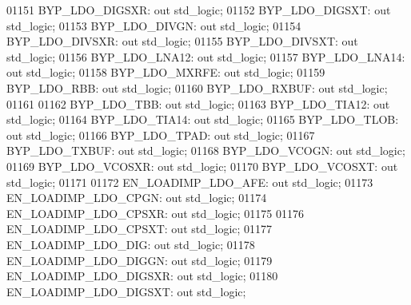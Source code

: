 \begin{DoxyCode}
01151         BYP\_LDO\_DIGSXR: \textcolor{keywordflow}{out} \textcolor{comment}{std\_logic};
01152         BYP\_LDO\_DIGSXT: \textcolor{keywordflow}{out} \textcolor{comment}{std\_logic};
01153         BYP\_LDO\_DIVGN:  \textcolor{keywordflow}{out} \textcolor{comment}{std\_logic};
01154         BYP\_LDO\_DIVSXR: \textcolor{keywordflow}{out} \textcolor{comment}{std\_logic};
01155         BYP\_LDO\_DIVSXT: \textcolor{keywordflow}{out} \textcolor{comment}{std\_logic};
01156         BYP\_LDO\_LNA12:  \textcolor{keywordflow}{out} \textcolor{comment}{std\_logic};
01157         BYP\_LDO\_LNA14:  \textcolor{keywordflow}{out} \textcolor{comment}{std\_logic};
01158         BYP\_LDO\_MXRFE:  \textcolor{keywordflow}{out} \textcolor{comment}{std\_logic};
01159         BYP\_LDO\_RBB:    \textcolor{keywordflow}{out} \textcolor{comment}{std\_logic};
01160         BYP\_LDO\_RXBUF:  \textcolor{keywordflow}{out} \textcolor{comment}{std\_logic};
01161 
01162         BYP\_LDO\_TBB:    \textcolor{keywordflow}{out} \textcolor{comment}{std\_logic};
01163         BYP\_LDO\_TIA12:  \textcolor{keywordflow}{out} \textcolor{comment}{std\_logic};
01164         BYP\_LDO\_TIA14:  \textcolor{keywordflow}{out} \textcolor{comment}{std\_logic};
01165         BYP\_LDO\_TLOB:   \textcolor{keywordflow}{out} \textcolor{comment}{std\_logic};
01166         BYP\_LDO\_TPAD:   \textcolor{keywordflow}{out} \textcolor{comment}{std\_logic};
01167         BYP\_LDO\_TXBUF:  \textcolor{keywordflow}{out} \textcolor{comment}{std\_logic};
01168         BYP\_LDO\_VCOGN:  \textcolor{keywordflow}{out} \textcolor{comment}{std\_logic};
01169         BYP\_LDO\_VCOSXR: \textcolor{keywordflow}{out} \textcolor{comment}{std\_logic};
01170         BYP\_LDO\_VCOSXT: \textcolor{keywordflow}{out} \textcolor{comment}{std\_logic};
01171  
01172         EN\_LOADIMP\_LDO\_AFE: \textcolor{keywordflow}{out} \textcolor{comment}{std\_logic};
01173         EN\_LOADIMP\_LDO\_CPGN:    \textcolor{keywordflow}{out} \textcolor{comment}{std\_logic};
01174         EN\_LOADIMP\_LDO\_CPSXR:   \textcolor{keywordflow}{out} \textcolor{comment}{std\_logic};
01175 
01176         EN\_LOADIMP\_LDO\_CPSXT:   \textcolor{keywordflow}{out} \textcolor{comment}{std\_logic};
01177         EN\_LOADIMP\_LDO\_DIG: \textcolor{keywordflow}{out} \textcolor{comment}{std\_logic};
01178         EN\_LOADIMP\_LDO\_DIGGN:   \textcolor{keywordflow}{out} \textcolor{comment}{std\_logic};
01179         EN\_LOADIMP\_LDO\_DIGSXR:  \textcolor{keywordflow}{out} \textcolor{comment}{std\_logic};
01180         EN\_LOADIMP\_LDO\_DIGSXT:  \textcolor{keywordflow}{out} \textcolor{comment}{std\_logic};

\end{DoxyCode}
